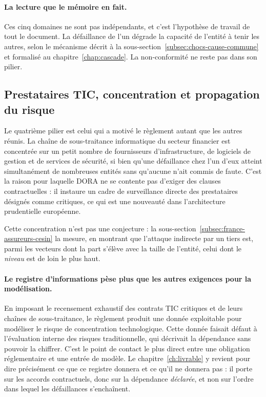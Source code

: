 \paragraph{La lecture que le mémoire en fait.} Ces cinq domaines ne sont pas indépendants, et
c'est l'hypothèse de travail de tout le document. La défaillance de l'un dégrade la capacité de
l'entité à tenir les autres, selon le mécanisme décrit à la
sous-section~\ref{subsec:chocs-cause-commune} et formalisé au chapitre~\ref{chap:cascade}. La
non-conformité ne reste pas dans son pilier.

\subsection{Prestataires TIC, concentration et propagation du risque}
\label{subsec:risque-tiers-dora}

Le quatrième pilier est celui qui a motivé le règlement autant que les autres réunis. La chaîne
de sous-traitance informatique du secteur financier est concentrée sur un petit nombre de
fournisseurs d'infrastructure, de logiciels de gestion et de services de sécurité, si bien qu'une
défaillance chez l'un d'eux atteint simultanément de nombreuses entités sans qu'aucune n'ait
commis de faute. C'est la raison pour laquelle DORA ne se contente pas d'exiger des clauses
contractuelles : il instaure un cadre de surveillance directe des prestataires désignés comme
critiques, ce qui est une nouveauté dans l'architecture prudentielle européenne.

Cette concentration n'est pas une conjecture : la sous-section~\ref{subsec:france-assureurs-cesin}
la mesure, en montrant que l'attaque indirecte par un tiers est, parmi les vecteurs dont la part
s'élève avec la taille de l'entité, celui dont le \emph{niveau} est de loin le plus haut.

\paragraph{Le registre d'informations pèse plus que les autres exigences pour la modélisation.}
En imposant le recensement exhaustif des contrats TIC critiques et de leurs chaînes de
sous-traitance, le règlement produit une donnée exploitable pour modéliser le risque de
concentration technologique. Cette donnée faisait défaut à l'évaluation interne des risques
traditionnelle, qui décrivait la dépendance sans pouvoir la chiffrer. C'est le point de contact
le plus direct entre une obligation réglementaire et une entrée de modèle. Le
chapitre~\ref{ch:livrable} y revient pour dire précisément ce que ce registre donnera et ce
qu'il ne donnera pas : il porte sur les accords contractuels, donc sur la dépendance
\emph{déclarée}, et non sur l'ordre dans lequel les défaillances s'enchaînent.

